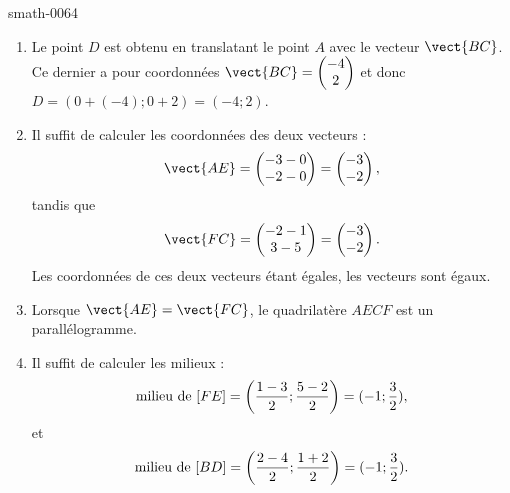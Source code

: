 
\begin{corrige}{smath-0064}

    \begin{enumerate}
        \item
            Le point \( D\) est obtenu en translatant le point \( A\) avec le vecteur \( \vect{ BC }\). Ce dernier a pour coordonnées \( \vect{ BC }=\begin{pmatrix}
                -4    \\ 
                2    
            \end{pmatrix}\) et donc \( D=(0+(-4);0+2)=(-4;2)\).
        \item
            Il suffit de calculer les coordonnées des deux vecteurs :
            \begin{equation}
                \vect{ AE }=\begin{pmatrix}
                    -3-0    \\ 
                    -2-0    
                \end{pmatrix}=\begin{pmatrix}
                    -3    \\ 
                    -2    
                \end{pmatrix},
            \end{equation}
            tandis que
            \begin{equation}
                \vect{ FC }=\begin{pmatrix}
                    -2-1    \\ 
                    3-5    
                \end{pmatrix}=\begin{pmatrix}
                    -3    \\ 
                    -2    
                \end{pmatrix}.
            \end{equation}
            Les coordonnées de ces deux vecteurs étant égales, les vecteurs sont égaux.
        \item
            Lorsque \( \vect{ AE }=\vect{ FC }\), le quadrilatère \( AECF\) est un parallélogramme.
        \item
            Il suffit de calculer les milieux :
            \begin{equation}
                \text{milieu de \( [FE]\)}=\left( \frac{ 1-3 }{2};\frac{ 5-2 }{2} \right)=(-1;\frac{ 3 }{2}),
            \end{equation}
            et
            \begin{equation}
                \text{milieu de \( [BD]\)}=\left( \frac{ 2-4}{2};\frac{ 1+2 }{2} \right)=(-1;\frac{ 3 }{2}).
            \end{equation}
            
    \end{enumerate}

\end{corrige}
